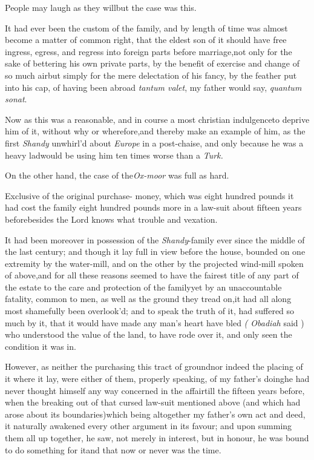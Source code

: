 \documentclass{article}
\begin{document}
\tsk People may laugh as they will\tsh but the case
was this.

It had ever been the custom of the family, and by length of time
was almost become a matter of common right, that the eldest son of
it should have free ingress, egress, and regress into foreign parts
before marriage,\tsk not only for the sake of bettering his own
private parts, by the benefit of exercise and change of so much
air\tsk but simply for the mere delectation of his fancy, by the
feather
put into his cap, of having been abroad\break
\tsk \textit{tantum valet}, my father would say,
\textit{quantum sonat}.

Now as this was a reasonable, and in course a most christian
indulgence\tsh to deprive him of it, without why or\break
wherefore,\tsh and thereby make an example of him, as the
first \textit{Shandy} unwhirl’d about \textit{Europe} in a
post-chaise, and only because he was a heavy lad\tsh would
be using him ten times worse than a \textit{Turk.}

On the other hand, the case of the\break \textit{Ox-moor} was full as
hard.

Exclusive of the original purchase-\break
money, which was eight hundred pounds\break
\tsk it had cost the family eight hundred
pounds more in a law-suit about fifteen
years before\tsk besides the Lord knows what trouble and vexation.

It had been moreover in possession of the \textit{Shandy}-family
ever since the middle of the last century; and though it lay full
in view before the house, bounded on one extremity by the
water-mill, and on the other by the projected wind-mill
spoken of above,\tsk and for all these reasons
seemed to have the fairest title of any part of the estate to the
care and protection of the family\tsk yet by an unaccountable
fatality, common to men, as well as the ground they tread
on,\tsk it had all along most shamefully been
overlook’d; and to speak the truth of it, had suffered so
much by it, that it would have made any man’s heart have bled
\sic\textit{( Obadiah} said ) who understood the value of the land, to have
rode over it, and only seen the condition it was in.

However, as neither the purchasing this tract of
ground\tsk nor indeed the placing of it where it lay, were either
of them, properly speaking, of my father’s
doing\tsk he had never thought himself any way concerned
in the affair\tsk till the fifteen years before, when the
breaking out of that cursed law-suit mentioned above (and which had
arose about its boundaries)\tsk which being altogether my
father’s own act and deed, it naturally awakened every other
argument in its favour; and upon summing them all up
together, he saw, not merely in interest, but in honour, he was
bound to do something for it\tsk and that now or never was
the time.
\end{document}
